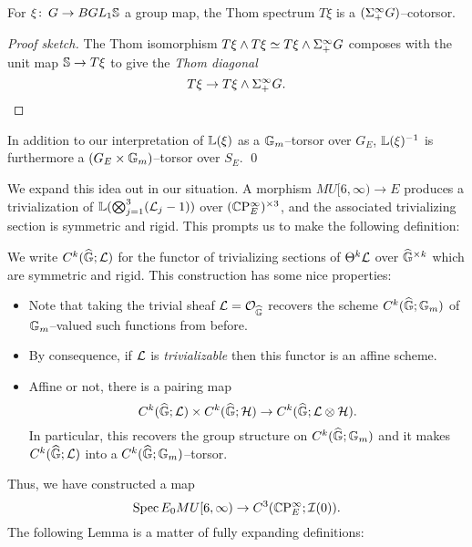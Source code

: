 \begin{lemma}
For $\xi\co G \to BGL_1 \S$ a group map, the Thom spectrum $T\xi$ is a $(\Susp^\infty_+ G)$--cotorsor.
\end{lemma}
\begin{proof}[Proof sketch]
The Thom isomorphism $T\xi \sm T\xi \simeq T\xi \sm \Susp^\infty_+ G$ composes with the unit map $\S \to T\xi$ to give the \textit{Thom diagonal} \[T\xi \to T\xi \sm \Susp^\infty_+ G. \qedhere\]
\end{proof}

\begin{corollary}
In addition to our interpretation of $\ThomSheaf{\xi}$ as a $\Gm$--torsor over $G_E$, $\ThomSheaf{\xi}^{-1}$ is furthermore a $(G_E \times \Gm)$--torsor over $S_E$. \qed
\end{corollary}

We expand this idea out in our situation.  A morphism $MU[6, \infty) \to E$ produces a trivialization of $\ThomSheaf{\bigotimes_{j=1}^3 (\L_j - 1)}$ over $(\CP^\infty_E)^{\times 3}$, and the associated trivializing section is symmetric and rigid.  This prompts us to make the following definition:

\begin{definition}
We write $C^k(\G; \sheaf L)$ for the functor of trivializing sections of $\Theta^k \sheaf L$ over $\G^{\times k}$ which are symmetric and rigid.  This construction has some nice properties:
\begin{itemize}
\item Note that taking the trivial sheaf $\sheaf L = \sheaf O_{\G}$ recovers the scheme $C^k(\G; \Gm)$ of $\Gm$--valued such functions from before.
\item By consequence, if $\sheaf L$ is \emph{trivializable} then this functor is an affine scheme.
\item Affine or not, there is a pairing map \[C^k(\G; \sheaf L) \times C^k(\G; \sheaf H) \to C^k(\G; \sheaf L \otimes \sheaf H).\]  In particular, this recovers the group structure on $C^k(\G; \Gm)$ and it makes $C^k(\G; \sheaf L)$ into a $C^k(\G; \Gm)$--torsor.
\end{itemize}
\end{definition}

\noindent Thus, we have constructed a map \[\Spec E_0 MU[6, \infty) \to C^3(\CP^\infty_E; \sheaf I(0)).\] The following Lemma is a matter of fully expanding definitions:

